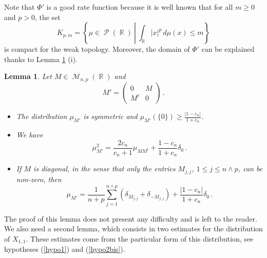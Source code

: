 \documentclass[11pt,a4paper]{article}
\DeclareMathOperator{\R}{\mathbb{R}}
\DeclareMathOperator{\MM}{\mathcal{M}}
\DeclareMathOperator{\PP}{\mathcal{P}}
\DeclareMathOperator{\1}{\mathbf{1}}
\newtheorem{Lemma}[Proposition]{Lemma}
\theoremstyle{definition}
\begin{document}
Note that $\Phi'$ is a good rate function because it is well known that for all $m \ge 0$ and $p>0$, the set
\begin{equation} \label{Kpm}
K_{p,m} = \left\{ \mu \in \PP(\R) \ \left| \ \int_{\R} |x|^p \, d\mu(x) \le m \right. \right\}
\end{equation}
is compact for the weak topology. Moreover, the domain of $\Phi'$ can be explained thanks to Lemma \ref{LDP_C'_lemma1} (i).

\begin{Lemma} \label{LDP_C'_lemma1}
Let $M \in \MM_{n,p}(\R)$ and
\begin{displaymath}
M' = \left( \begin{array}{c|c} 0 & M \\ \hline M^t & 0 \end{array} \right) \, .
\end{displaymath}
\begin{itemize}
\item[(i)] The distribution $\mu_{M'}$ is symmetric and $\mu_{M'}(\{0\}) \ge \frac{|1-c_n|}{1+c_n}$.
\item[(ii)] We have
\begin{equation} \label{muM'2}
\mu_{M'}^2 = \frac{2c_n}{c_n+1} \mu_{MM^t} + \frac{1-c_n}{1+c_n} \delta_0 \, .
\end{equation}
\item[(iii)] If $M$ is diagonal, in the sense that only the entries $M_{j,j}$, $1 \le j \le n \wedge p$, can be non-zero, then
\begin{equation} \label{muM'}
\mu_{M'} = \frac{1}{n+p} \sum_{j=1}^{n \wedge p} \left( \delta_{M_{j,j}} + \delta_{-M_{j,j}} \right) + \frac{|1-c_n|}{1+c_n} \delta_0 \, .
\end{equation}
\end{itemize}
\end{Lemma}

The proof of this lemma does not present any difficulty and is left to the reader. We also need a second lemma, which consists in two estimates for the distribution of $X_{1,1}$. These estimates come from the particular form of this distribution, see hypotheses (\ref{hypo1}) and (\ref{hypo2bis}).
\end{document}
